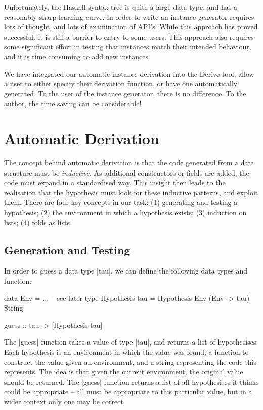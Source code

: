 \documentclass{llncs}
\begin{document}
Unfortunately, the Haskell syntax tree is quite a large data type, and has a reasonably sharp learning curve. In order to write an instance generator requires lots of thought, and lots of examination of API's. While this approach has proved successful, it is still a barrier to entry to some users. This approach also requires some significant effort in testing that instances match their intended behaviour, and it is time consuming to add new instances.

We have integrated our automatic instance derivation into the Derive tool, allow a user to either specify their derivation function, or have one automatically generated. To the user of the instance generator, there is no difference. To the author, the time saving can be considerable!


\section{Automatic Derivation}

The concept behind automatic derivation is that the code generated from a data structure must be \textit{inductive}. As additional constructors or fields are added, the code must expand in a standardised way. This insight then leads to the realisation that the hypothesis must look for these inductive patterns, and exploit them. There are four key concepts in our task: (1) generating and testing a hypothesis; (2) the environment in which a hypothesis exists; (3) induction on lists; (4) folds as lists.

\subsection{Generation and Testing}

In order to guess a data type |tau|, we can define the following data types and function:

\begin{code}
data Env = ... -- see later
type Hypothesis tau = Hypothesis Env (Env -> tau) String

guess :: tau -> [Hypothesis tau]
\end{code}

The |guess| function takes a value of type |tau|, and returns a list of hypothesises. Each hypothesis is an environment in which the value was found, a function to construct the value given an environment, and a string representing the code this represents. The idea is that given the current environment, the original value should be returned. The |guess| function returns a list of all hypothesises it thinks could be appropriate -- all must be appropriate to this particular value, but in a wider context only one may be correct.
\end{document}
